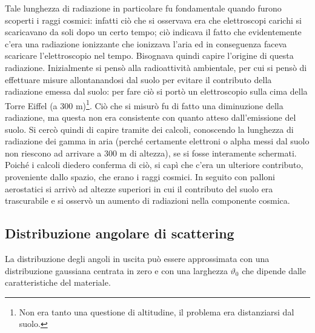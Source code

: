 Tale lunghezza di radiazione in particolare fu fondamentale quando furono scoperti i raggi cosmici: infatti ciò che si osservava era che elettroscopi carichi si scaricavano da soli dopo un certo tempo; ciò indicava il fatto che evidentemente c'era una radiazione ionizzante che ionizzava l'aria ed in conseguenza faceva scaricare l'elettroscopio nel tempo. Bisognava quindi capire l'origine di questa radiazione. Inizialmente si pensò alla radioattività ambientale, per cui si pensò di effettuare misure allontanandosi dal suolo per evitare il contributo della radiazione emessa dal suolo: per fare ciò si portò un elettroscopio sulla cima della Torre Eiffel (a 300 m)\footnote{Non era tanto una questione di altitudine, il problema era distanziarsi dal suolo.}. Ciò che si misurò fu di fatto una diminuzione della radiazione, ma questa non era consistente con quanto atteso dall'emissione del suolo. Si cercò quindi di capire tramite dei calcoli, conoscendo la lunghezza di radiazione dei gamma in aria (perché certamente elettroni o alpha messi dal suolo non riescono ad arrivare a 300 m di altezza), se si fosse interamente schermati. Poiché i calcoli diedero conferma di ciò, si capì che c'era un ulteriore contributo, proveniente dallo spazio, che erano i raggi cosmici. In seguito con palloni aerostatici si arrivò ad altezze superiori in cui il contributo del suolo era trascurabile e si osservò un aumento di radiazioni nella componente cosmica.

\subsection{Distribuzione angolare di scattering}
La distribuzione degli angoli in uscita può essere approssimata con una distribuzione gaussiana centrata in zero e con una larghezza $\vartheta_0$ che dipende dalle caratteristiche del materiale.

